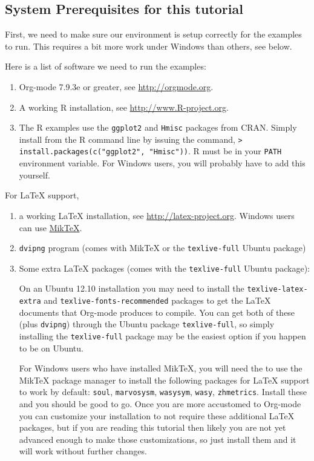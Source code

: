 \documentclass[11pt]{article}
\begin{document}
\subsection*{System Prerequisites for this tutorial}
\label{sec-1-1}

First, we need to make sure our environment is setup correctly for the examples to run.  This requires a bit more work under Windows than others, see below.

Here is a list of software we need to run the examples:
\begin{enumerate}
\item Org-mode 7.9.3e or greater, see \url{http://orgmode.org}.
\item A working R installation, see \url{http://www.R-project.org}.
\item The R examples use the \texttt{ggplot2} and \texttt{Hmisc} packages from CRAN. Simply install from the R command line by issuing the command, \texttt{> install.packages(c("ggplot2", "Hmisc"))}. R must be in your \texttt{PATH} environment variable.  For Windows users, you will probably have to add this yourself.
\end{enumerate}

For \LaTeX{} support, 
\begin{enumerate}
\item a working \LaTeX{} installation, see \url{http://latex-project.org}. Windows users can use \href{http://miktex.org/}{MikTeX}.
\item \texttt{dvipng} program (comes with MikTeX or the \texttt{texlive-full} Ubuntu package)
\item Some extra \LaTeX{} packages (comes with the \texttt{texlive-full} Ubuntu package): 

On an Ubuntu 12.10 installation you may need to install the \texttt{texlive-latex-extra} and \texttt{texlive-fonts-recommended} packages to get the \LaTeX{} documents that Org-mode produces to compile. You can get both of these (plus \texttt{dvipng}) through the Ubuntu package \texttt{texlive-full}, so simply installing the \texttt{texlive-full} package may be the easiest option if you happen to be on Ubuntu.

For Windows users who have installed MikTeX, you will need the to use the MikTeX package manager to install the following packages for \LaTeX{} support to work by default: \texttt{soul}, \texttt{marvosysm}, \texttt{wasysym}, \texttt{wasy}, \texttt{zhmetrics}. Install these and you should be good to go. Once you are more accustomed to Org-mode you can customize your installation to not require these additional \LaTeX{} packages, but if you are reading this tutorial then likely you are not yet advanced enough to make those customizations, so just install them and it will work without further changes.
\end{enumerate}
\end{document}
